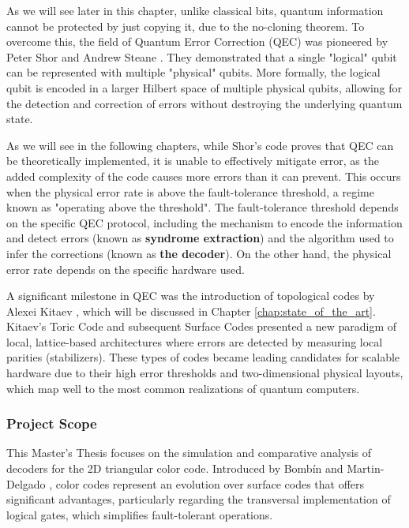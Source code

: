 As we will see later in this chapter, unlike classical bits, quantum information cannot be protected by just copying it, due to the no-cloning theorem. To overcome this, the field of Quantum Error Correction (QEC) was pioneered by Peter Shor \cite{shor1995scheme} and Andrew Steane \cite{steane1996error}. They demonstrated that a single "logical" qubit can be represented with multiple "physical" qubits. More formally, the logical qubit is encoded in a larger Hilbert space of multiple physical qubits, allowing for the detection and correction of errors without destroying the underlying quantum state.

As we will see in the following chapters, while Shor's code proves that QEC can be theoretically implemented, it is unable to effectively mitigate error, as the added complexity of the code causes more errors than it can prevent. This occurs when the physical error rate is above the fault-tolerance threshold, a regime known as "operating above the threshold". The fault-tolerance threshold depends on the specific QEC protocol, including the mechanism to encode the information and detect errors (known as \textbf{syndrome extraction}) and the algorithm used to infer the corrections (known as \textbf{the decoder}). On the other hand, the physical error rate depends on the specific hardware used.

A significant milestone in QEC was the introduction of topological codes by Alexei Kitaev \cite{kitaev2003fault}, which will be discussed in Chapter \ref{chap:state_of_the_art}. Kitaev's Toric Code and subsequent Surface Codes presented a new paradigm of local, lattice-based architectures where errors are detected by measuring local parities (stabilizers). These types of codes became leading candidates for scalable hardware due to their high error thresholds and two-dimensional physical layouts, which map well to the most common realizations of quantum computers.

\subsubsection*{Project Scope}

This Master’s Thesis focuses on the simulation and comparative analysis of decoders for the 2D triangular color code. Introduced by Bombín and Martin-Delgado \cite{bombin_martindelgado_2006}, color codes represent an evolution over surface codes that offers significant advantages, particularly regarding the transversal implementation of logical gates, which simplifies fault-tolerant operations.

